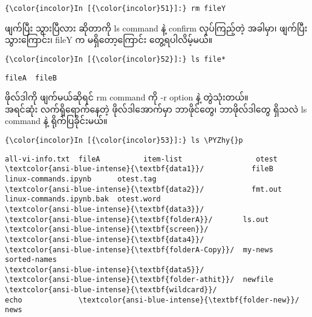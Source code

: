 \documentclass[11pt]{article}
\def\PYZhy{\char`\-}
\begin{document}
    \begin{Verbatim}[commandchars=\\\{\}]
{\color{incolor}In [{\color{incolor}51}]:} rm fileY
\end{Verbatim}

    ဖျက်ပြီး သွားပြီလား ဆိုတာကို ls command နဲ့ confirm လုပ်ကြည့်တဲ့ အခါမှာ၊
ဖျက်ပြီးသွားကြောင်း၊ fileY က မရှိတော့ကြောင်း တွေ့ရပါလိမ့်မယ်။

    \begin{Verbatim}[commandchars=\\\{\}]
{\color{incolor}In [{\color{incolor}52}]:} ls file*
\end{Verbatim}

    \begin{Verbatim}[commandchars=\\\{\}]
fileA  fileB

    \end{Verbatim}

    ဖိုလ်ဒါကို ဖျက်မယ်ဆိုရင် rm command ကို -r option နဲ့ တွဲသုံးတယ်။\\
အရင်ဆုံး လက်ရှိရောက်နေတဲ့ ဖိုလ်ဒါအောက်မှာ ဘာဖိုင်တွေ၊ ဘာဖိုလ်ဒါတွေ
ရှိသလဲ ls command နဲ့ ရိုက်ပြခိုင်းမယ်။

    \begin{Verbatim}[commandchars=\\\{\}]
{\color{incolor}In [{\color{incolor}53}]:} ls \PYZhy{}p
\end{Verbatim}

    \begin{Verbatim}[commandchars=\\\{\}]
all-vi-info.txt  fileA          item-list                 otest
\textcolor{ansi-blue-intense}{\textbf{data1}}/           fileB          linux-commands.ipynb      otest.tag
\textcolor{ansi-blue-intense}{\textbf{data2}}/           fmt.out        linux-commands.ipynb.bak  otest.word
\textcolor{ansi-blue-intense}{\textbf{data3}}/           \textcolor{ansi-blue-intense}{\textbf{folderA}}/       ls.out                    \textcolor{ansi-blue-intense}{\textbf{screen}}/
\textcolor{ansi-blue-intense}{\textbf{data4}}/           \textcolor{ansi-blue-intense}{\textbf{folderA-Copy}}/  my-news                   sorted-names
\textcolor{ansi-blue-intense}{\textbf{data5}}/           \textcolor{ansi-blue-intense}{\textbf{folder-athit}}/  newfile                   \textcolor{ansi-blue-intense}{\textbf{wildcard}}/
echo             \textcolor{ansi-blue-intense}{\textbf{folder-new}}/    news

    \end{Verbatim}
\end{document}
